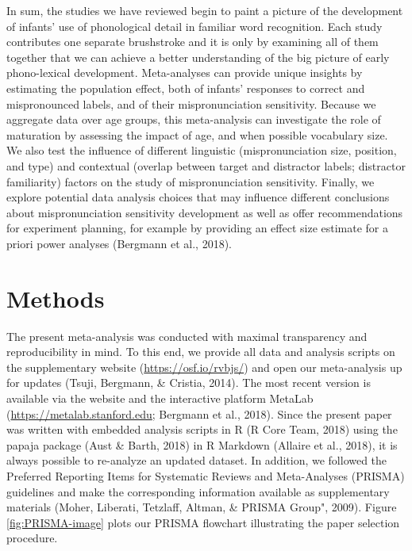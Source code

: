 \documentclass[
  man, noextraspace]{apa6}
\begin{document}
In sum, the studies we have reviewed begin to paint a picture of the development of infants' use of phonological detail in familiar word recognition. Each study contributes one separate brushstroke and it is only by examining all of them together that we can achieve a better understanding of the big picture of early phono-lexical development. Meta-analyses can provide unique insights by estimating the population effect, both of infants' responses to correct and mispronounced labels, and of their mispronunciation sensitivity. Because we aggregate data over age groups, this meta-analysis can investigate the role of maturation by assessing the impact of age, and when possible vocabulary size. We also test the influence of different linguistic (mispronunciation size, position, and type) and contextual (overlap between target and distractor labels; distractor familiarity) factors on the study of mispronunciation sensitivity. Finally, we explore potential data analysis choices that may influence different conclusions about mispronunciation sensitivity development as well as offer recommendations for experiment planning, for example by providing an effect size estimate for a priori power analyses (Bergmann et al., 2018).

\hypertarget{methods}{%
\section{Methods}\label{methods}}

The present meta-analysis was conducted with maximal transparency and reproducibility in mind. To this end, we provide all data and analysis scripts on the supplementary website (\url{https://osf.io/rvbjs/}) and open our meta-analysis up for updates (Tsuji, Bergmann, \& Cristia, 2014). The most recent version is available via the website and the interactive platform MetaLab (\url{https://metalab.stanford.edu}; Bergmann et al., 2018). Since the present paper was written with embedded analysis scripts in R (R Core Team, 2018) using the papaja package (Aust \& Barth, 2018) in R Markdown (Allaire et al., 2018), it is always possible to re-analyze an updated dataset. In addition, we followed the Preferred Reporting Items for Systematic Reviews and Meta-Analyses (PRISMA) guidelines and make the corresponding information available as supplementary materials (Moher, Liberati, Tetzlaff, Altman, \& PRISMA Group", 2009). Figure \ref{fig:PRISMA-image} plots our PRISMA flowchart illustrating the paper selection procedure.
\end{document}
